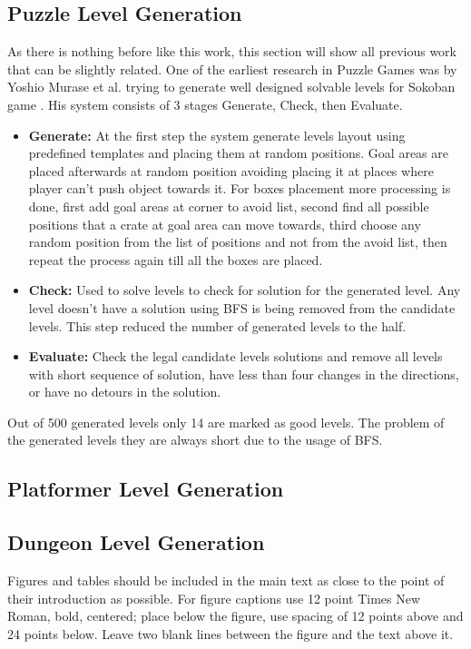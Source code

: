 \subsection{Puzzle Level Generation}
As there is nothing before like this work, this section will show all previous work that can be slightly related. One of the earliest research in Puzzle Games was by Yoshio Murase et al. trying to generate well designed solvable levels for Sokoban game \cite{sokobanLevelGenerationOld}. His system consists of 3 stages Generate, Check, then Evaluate. 
\begin{itemize} \itemsep0pt \parskip0pt 
	\item \textbf{Generate:} At the first step the system generate levels layout using predefined templates and placing them at random positions. Goal areas are placed afterwards at random position avoiding placing it at places where player can't push object towards it. For boxes placement more processing is done, first add goal areas at corner to avoid list, second find all possible positions that a crate at goal area can move towards, third choose any random position from the list of positions and not from the avoid list, then repeat the process again till all the boxes are placed.
  	\item \textbf{Check:} Used  to solve levels to check for solution for the generated level. Any level doesn't have a solution using BFS is being removed from the candidate levels. This step reduced the number of generated levels to the half.
  	\item \textbf{Evaluate:} Check the legal candidate levels solutions and remove all levels with short sequence of solution, have less than four changes in the directions, or have no detours in the solution.
\end{itemize}
Out of 500 generated levels only 14 are marked as good levels. The problem of the generated levels they are always short due to the usage of BFS.


\subsection{Platformer Level Generation}

\subsection{Dungeon Level Generation}


\pagebreak
Figures and tables should be included in the main text as close to the point of their introduction as possible. For figure captions use 12 point Times New Roman, bold, centered; place below the figure, use spacing of 12 points above and 24 points below. Leave two blank lines between the figure and the text above it. 


